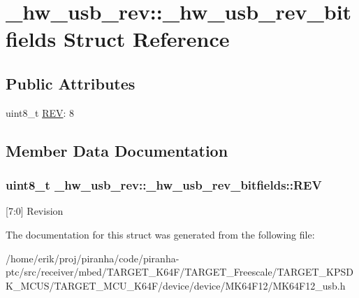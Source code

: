 \hypertarget{struct__hw__usb__rev_1_1__hw__usb__rev__bitfields}{}\section{\+\_\+hw\+\_\+usb\+\_\+rev\+:\+:\+\_\+hw\+\_\+usb\+\_\+rev\+\_\+bitfields Struct Reference}
\label{struct__hw__usb__rev_1_1__hw__usb__rev__bitfields}
\subsection*{Public Attributes}
\begin{DoxyCompactItemize}
\item 
uint8\+\_\+t \hyperlink{struct__hw__usb__rev_1_1__hw__usb__rev__bitfields_aba0c81b1aa9ce606b6e662e752446b97}{R\+EV}\+: 8
\end{DoxyCompactItemize}


\subsection{Member Data Documentation}
\subsubsection[{\texorpdfstring{R\+EV}{REV}}]{\setlength{\rightskip}{0pt plus 5cm}uint8\+\_\+t \+\_\+hw\+\_\+usb\+\_\+rev\+::\+\_\+hw\+\_\+usb\+\_\+rev\+\_\+bitfields\+::\+R\+EV}\hypertarget{struct__hw__usb__rev_1_1__hw__usb__rev__bitfields_aba0c81b1aa9ce606b6e662e752446b97}{}\label{struct__hw__usb__rev_1_1__hw__usb__rev__bitfields_aba0c81b1aa9ce606b6e662e752446b97}
\mbox{[}7\+:0\mbox{]} Revision 

The documentation for this struct was generated from the following file\+:\begin{DoxyCompactItemize}
\item 
/home/erik/proj/piranha/code/piranha-\/ptc/src/receiver/mbed/\+T\+A\+R\+G\+E\+T\+\_\+\+K64\+F/\+T\+A\+R\+G\+E\+T\+\_\+\+Freescale/\+T\+A\+R\+G\+E\+T\+\_\+\+K\+P\+S\+D\+K\+\_\+\+M\+C\+U\+S/\+T\+A\+R\+G\+E\+T\+\_\+\+M\+C\+U\+\_\+\+K64\+F/device/device/\+M\+K64\+F12/M\+K64\+F12\+\_\+usb.\+h\end{DoxyCompactItemize}
